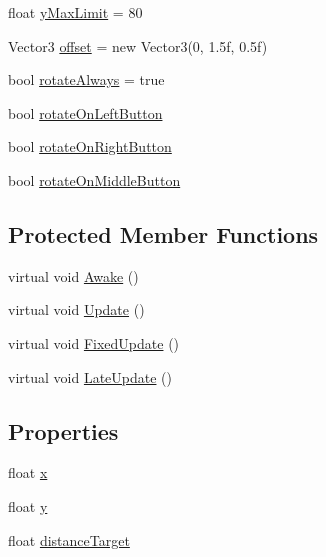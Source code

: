 \begin{DoxyCompactItemize}
\item 
float \mbox{\hyperlink{class_root_motion_1_1_camera_controller_afe4d04c437d077e5b5cc438da117c409}{y\+Max\+Limit}} = 80
\item 
Vector3 \mbox{\hyperlink{class_root_motion_1_1_camera_controller_a78566a02f2a20d09ee9acbdd85eb81dd}{offset}} = new Vector3(0, 1.\+5f, 0.\+5f)
\item 
bool \mbox{\hyperlink{class_root_motion_1_1_camera_controller_abc75818d84501062de6d0c985337b0bd}{rotate\+Always}} = true
\item 
bool \mbox{\hyperlink{class_root_motion_1_1_camera_controller_a7a9360b66e76848a52fca6741d4554d0}{rotate\+On\+Left\+Button}}
\item 
bool \mbox{\hyperlink{class_root_motion_1_1_camera_controller_a22ee0d8fd50034fd452c44d22f57f5c4}{rotate\+On\+Right\+Button}}
\item 
bool \mbox{\hyperlink{class_root_motion_1_1_camera_controller_ac7250db7ed7875b7fa25ef44343e27cc}{rotate\+On\+Middle\+Button}}
\end{DoxyCompactItemize}
\subsection*{Protected Member Functions}
\begin{DoxyCompactItemize}
\item 
virtual void \mbox{\hyperlink{class_root_motion_1_1_camera_controller_abbe96b96da2d114f3b726ba9c5b7d5ad}{Awake}} ()
\item 
virtual void \mbox{\hyperlink{class_root_motion_1_1_camera_controller_a4c579628b881fdd1c589f9287cc5a7a7}{Update}} ()
\item 
virtual void \mbox{\hyperlink{class_root_motion_1_1_camera_controller_ae8784b0a9346a8ef6eeae9f7bfd74bdc}{Fixed\+Update}} ()
\item 
virtual void \mbox{\hyperlink{class_root_motion_1_1_camera_controller_af7f19c87cc315e9d2c617fa87fde08df}{Late\+Update}} ()
\end{DoxyCompactItemize}
\subsection*{Properties}
\begin{DoxyCompactItemize}
\item 
float \mbox{\hyperlink{class_root_motion_1_1_camera_controller_a69bd1a5b1e0c5559fc4fb7d004b626a3}{x}}
\item 
float \mbox{\hyperlink{class_root_motion_1_1_camera_controller_a50cc5e2ef6161edf96ac895bfd533e8b}{y}}
\item 
float \mbox{\hyperlink{class_root_motion_1_1_camera_controller_a1559ad1c5a4212d6433fbdb11b5f6583}{distance\+Target}}
\end{DoxyCompactItemize}


